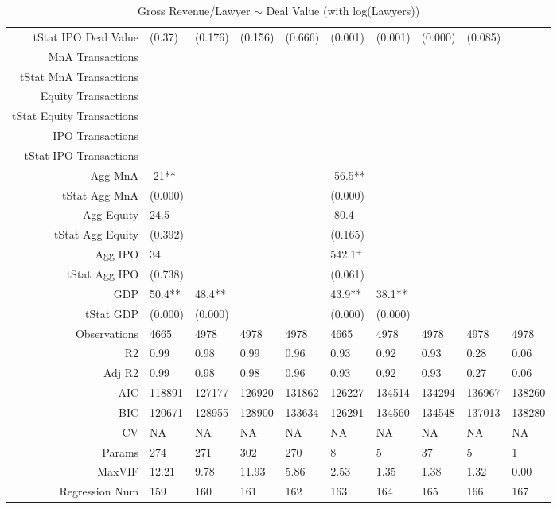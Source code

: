 \begin{table}[ht]
\begin{tabular}{rlllllllll}
  tStat IPO Deal Value & (0.37) & (0.176) & (0.156) & (0.666) & (0.001) & (0.001) & (0.000) & (0.085) &  \\ 
  MnA Transactions &  &  &  &  &  &  &  &  &  \\ 
  tStat MnA Transactions &  &  &  &  &  &  &  &  &  \\ 
  Equity Transactions &  &  &  &  &  &  &  &  &  \\ 
  tStat Equity Transactions &  &  &  &  &  &  &  &  &  \\ 
  IPO Transactions &  &  &  &  &  &  &  &  &  \\ 
  tStat IPO Transactions &  &  &  &  &  &  &  &  &  \\ 
  Agg MnA & -21** &  &  &  & -56.5** &  &  &  &  \\ 
  tStat Agg MnA & (0.000) &  &  &  & (0.000) &  &  &  &  \\ 
  Agg Equity & 24.5 &  &  &  & -80.4 &  &  &  &  \\ 
  tStat Agg Equity & (0.392) &  &  &  & (0.165) &  &  &  &  \\ 
  Agg IPO & 34 &  &  &  & 542.1$^{+}$ &  &  &  &  \\ 
  tStat Agg IPO & (0.738) &  &  &  & (0.061) &  &  &  &  \\ 
  GDP & 50.4** & 48.4** &  &  & 43.9** & 38.1** &  &  &  \\ 
  tStat GDP & (0.000) & (0.000) &  &  & (0.000) & (0.000) &  &  &  \\ 
  Observations & 4665 & 4978 & 4978 & 4978 & 4665 & 4978 & 4978 & 4978 & 4978 \\ 
  R2 & 0.99 & 0.98 & 0.99 & 0.96 & 0.93 & 0.92 & 0.93 & 0.28 & 0.06 \\ 
  Adj R2 & 0.99 & 0.98 & 0.98 & 0.96 & 0.93 & 0.92 & 0.93 & 0.27 & 0.06 \\ 
  AIC & 118891 & 127177 & 126920 & 131862 & 126227 & 134514 & 134294 & 136967 & 138260 \\ 
  BIC & 120671 & 128955 & 128900 & 133634 & 126291 & 134560 & 134548 & 137013 & 138280 \\ 
  CV & NA & NA & NA & NA & NA & NA & NA & NA & NA \\ 
  Params & 274 & 271 & 302 & 270 & 8 & 5 & 37 & 5 & 1 \\ 
  MaxVIF & 12.21 & 9.78 & 11.93 & 5.86 & 2.53 & 1.35 & 1.38 & 1.32 & 0.00 \\ 
  Regression Num & 159 & 160 & 161 & 162 & 163 & 164 & 165 & 166 & 167 \\ 
   \hline
\end{tabular}
\caption{Gross Revenue/Lawyer $\sim$ Deal Value (with log(Lawyers))} 
\end{table}
